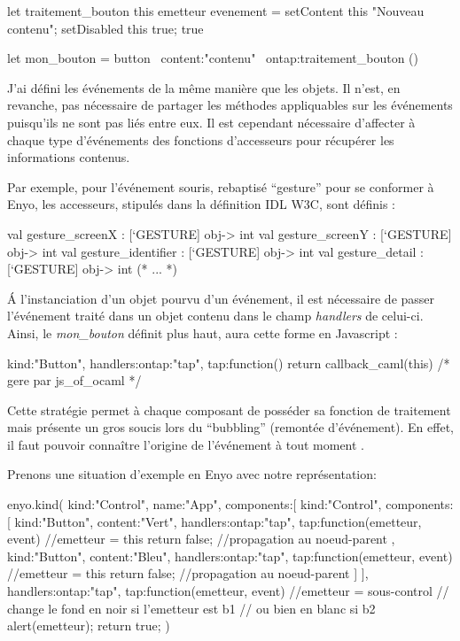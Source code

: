 \begin{OCaml}
let traitement_bouton this emetteur evenement = 
   setContent this "Nouveau contenu";
   setDisabled this true;
   true

let mon_bouton = button ~content:"contenu" ~ontap:traitement_bouton ()
\end{OCaml}

J'ai défini les événements de la même manière que les objets. Il n'est, en revanche, pas nécessaire 
de partager les méthodes appliquables sur les  événements puisqu'ils ne sont pas liés entre eux. Il 
est cependant nécessaire d'affecter à chaque type d'événements des fonctions d'accesseurs pour 
récupérer les informations contenus.

Par exemple, pour l'événement souris, rebaptisé ``gesture'' pour se conformer à Enyo, les accesseurs,
stipulés dans la définition IDL W3C, sont définis :

\begin{OCaml}
  val gesture_screenX : [`GESTURE] obj-> int
  val gesture_screenY : [`GESTURE] obj-> int
  val gesture_identifier : [`GESTURE] obj-> int
  val gesture_detail : [`GESTURE] obj-> int
  (* ... *)
\end{OCaml}
\medskip

\'A l'instanciation d'un objet pourvu d'un événement, il est nécessaire de passer l'événement traité
dans un objet contenu dans le champ \emph{handlers} de celui-ci. Ainsi, le \emph{mon\_bouton} définit plus haut,
aura cette forme en Javascript :

\begin{JavaScript}
  {kind:"Button", handlers:{ontap:"tap"}, 
    tap:function(){ return callback_caml(this) /* gere par js_of_ocaml */ }}
\end{JavaScript}

Cette stratégie permet à chaque composant de posséder sa fonction de traitement mais présente 
un gros soucis lors du ``bubbling'' (remontée d'événement). En effet, il faut pouvoir connaître l'origine
de l'événement à tout moment .

Prenons une situation d'exemple en Enyo avec notre représentation:
\begin{JavaScript}
enyo.kind({
    kind:"Control",
    name:"App",
    components:[
      {kind:"Control",
        components:[
          {kind:"Button", content:"Vert",         
            handlers:{ontap:"tap"},
            tap:function(emetteur, event){
              //emetteur = this 
              return false; //propagation au noeud-parent
            }
          },
          {kind:"Button", content:"Bleu",         
            handlers:{ontap:"tap"},
            tap:function(emetteur, event){
              //emetteur = this
              return false; //propagation au noeud-parent
            }
          }
        ]
        }
      ],
    handlers:{ontap:"tap"},
    tap:function(emetteur, event){
      //emetteur = sous-control
      // change le fond en noir si l'emetteur est b1
      // ou bien en blanc si b2 
      alert(emetteur);
      return true;
    }
})
\end{JavaScript}

